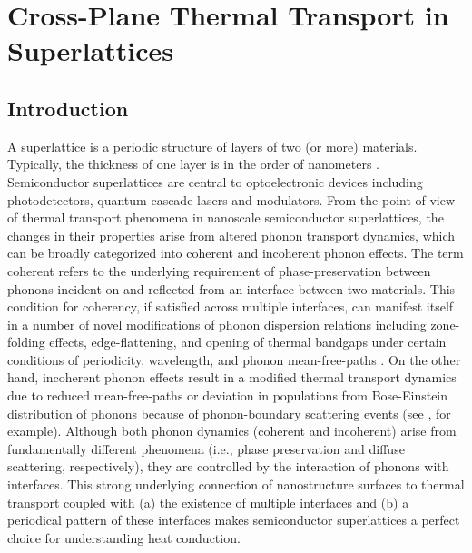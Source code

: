 \chapter{Cross-Plane Thermal Transport in Superlattices}
\label{chap:slxp}
\section{Introduction} 
A superlattice is a periodic structure of layers of two (or more) materials. Typically, the thickness of one layer is in the order of nanometers \cite{RN999}. Semiconductor superlattices are central to optoelectronic devices \cite{RN1000,Faist553,book_rogalski_infrared} including photodetectors, quantum cascade lasers and modulators. From the point of view of  thermal transport phenomena in nanoscale semiconductor superlattices, the changes in their properties arise from altered phonon transport dynamics, which can be broadly categorized into coherent and incoherent phonon effects. The term coherent refers to the underlying requirement of phase-preservation between phonons incident on and reflected from an interface between two materials. This condition for coherency, if satisfied across multiple interfaces, can manifest itself in a number of novel modifications of phonon dispersion relations including zone-folding effects, edge-flattening, and opening of thermal bandgaps under certain conditions of periodicity, wavelength, and phonon mean-free-paths \cite{RN362,RN132,RN253,RN394,RN329,RN399,RN393}. On the other hand, incoherent phonon effects result in a modified thermal transport dynamics due to reduced mean-free-paths or deviation in populations from Bose-Einstein distribution of phonons because of phonon-boundary scattering events (see , for example). Although both phonon dynamics (coherent and incoherent) arise from fundamentally different phenomena (i.e., phase preservation and diffuse scattering, respectively), they are controlled by the interaction of phonons with interfaces. This strong underlying connection of nanostructure surfaces to thermal transport coupled with (a) the existence of multiple interfaces and (b) a periodical pattern of these interfaces makes semiconductor superlattices a perfect choice for understanding heat conduction. 

